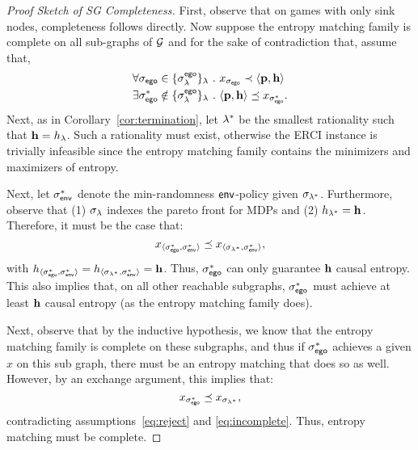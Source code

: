 \begin{proof}[Proof Sketch of SG Completeness]
  First, observe that on games with only sink nodes, completeness
  follows directly.
  Now suppose the entropy matching family is
  complete on all sub-graphs of $\mathcal{G}$ and for the sake of
  contradiction that, assume that,
  \begin{align}
    &\forall \sched_\pOne \in \{\sched^{\pOne}_\rat\}_\rat~.~ x_{\sched_{\pOne}} \prec \langle \scthreshold, \randomness \rangle\label{eq:reject}\\
    &\exists \sched_\pOne^* \notin \{\sched^{\pOne}_\rat\}_\rat~.~  \langle \scthreshold, \randomness \rangle \preceq x_{\sched_{\pOne}^*}\label{eq:incomplete}.
  \end{align}
  Next, as in Corollary~\ref{cor:termination}, let $\lambda^*$ be the smallest
  rationality such that $\mathbf{h} = h_\lambda$. Such a rationality must
  exist, otherwise the ERCI instance is trivially infeasible since the
  entropy matching family contains the minimizers and maximizers of entropy.


  Next, let
  $\sigma_{\mathsf{env}}^*$ denote the min-randomness $\mathsf{env}$-policy given
  $\sigma_{\lambda^*}$.
  Furthermore, observe that  (1) $\sigma_\lambda$ indexes the pareto front for MDPs and (2) $h_{\lambda^*} = \mathbf{h}$. Therefore, it must be
  the case that:
  \begin{equation}
    x_{\langle \sigma_{\mathsf{ego}}^*, \sigma_{\mathsf{env}}^* \rangle} \preceq x_{\langle \sigma_{\lambda^*}, \sigma_{\mathsf{env}}^* \rangle},
  \end{equation}
  with
  $h_{\langle \sigma_{\mathsf{ego}}^*, \sigma_{\mathsf{env}}^* \rangle} =
  h_{\langle \sigma_{\lambda^*}, \sigma_{\mathsf{env}}^* \rangle} =
  \mathbf{h}$.  Thus, $\sigma_{\mathsf{ego}}^*$ can only guarantee
  $\mathbf{h}$ causal entropy. This also implies that, on all other
  reachable subgraphs, $\sigma_{\mathsf{ego}}^*$ must
  achieve at least $\mathbf{h}$ causal entropy (as the entropy matching family does).
  

  Next, observe that by the inductive hypothesis, we know
  that the entropy matching family is complete on these subgraphs, and
  thus if $\sigma_{\mathsf{ego}}^*$ achieves a given $x$ on this sub graph,
  there must be an entropy matching that does so as well.
  However, by an exchange argument, this implies that:
  \begin{equation}
    x_{\sigma_{\mathsf{ego}}^*} \preceq x_{\sigma_{\lambda^*}},
  \end{equation}
  contradicting
  assumptions~\eqref{eq:reject} and \eqref{eq:incomplete}.  Thus,
  entropy matching must be complete.
\end{proof}

